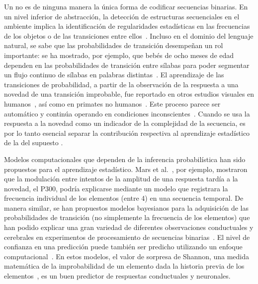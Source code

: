 Un \lot no es de ninguna manera la única forma de codificar secuencias binarias. En un nivel inferior de abstracción, la detección de estructuras secuenciales en el ambiente implica la identificación de regularidades estadísticas en las frecuencias de los objetos o de las transiciones entre ellos~\cite{f4,f20}. Incluso en el dominio del lenguaje natural, se sabe que las probabilidades de transición desempeñan un rol importante: se ha mostrado, por ejemplo, que bebés de ocho meses de edad dependen en las probabilidades de transición entre sílabas para poder segmentar un flujo continuo de sílabas en palabras distintas~\cite{f73,f74}. El aprendizaje de las transiciones de probabilidad, a partir de la observación de la respuesta a una novedad de una transición improbable, fue reportado en otros estudios visuales en humanos~\cite{f75,f76}, así como en primates no humanos~\cite{f77,f78}. Este proceso parece ser automático y continúa operando en condiciones inconscientes~\cite{f67,f71,f72}. Cuando se usa la respuesta a la novedad como un indicador de la complejidad de la secuencia, es por lo tanto esencial separar la contribución respectiva al aprendizaje estadístico de la del supuesto \lot.


Modelos computacionales que dependen de la inferencia probabilística han sido propuestos para el aprendizaje estadístico. Mars et al.~\cite{f79}, por ejemplo, mostraron que la modulación entre intentos de la amplitud de una respuesta tardía a la novedad, el P300, podría explicarse mediante un modelo que registrara la frecuencia individual de los elementos (entre 4) en una secuencia temporal. De manera similar, se han propuestos modelos bayesianos para la adquisición de las probabilidades de transición (no simplemente la frecuencia de los elementos) que han podido explicar una gran variedad de diferentes observaciones conductuales y cerebrales en experimentos de procesamiento de secuencias binarias~\cite{f20,f21}. El nivel de confianza en una predicción puede también ser predicho utilizando un enfoque computacional~\cite{f80,f81}. En estos modelos, el valor de sorpresa de Shannon, una medida matemática de la improbabilidad de un elemento dada la historia previa de los elementos~\cite{f82,shannon48,f84}, es un buen predictor de respuestas conductuales y neuronales.

